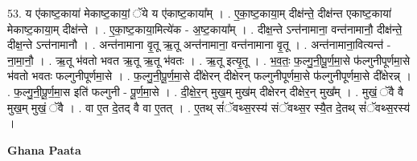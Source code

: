 \documentclass[17pt]{extarticle}
\begin{document}
53. य ए॑काष्ट॒काया॑ मेकाष्ट॒कायां॒ ॅये य ए॑काष्ट॒काया᳚म् । . ए॒का॒ष्ट॒काया॒म् दीक्ष॑न्ते॒ दीक्ष॑न्त एकाष्ट॒काया॑ मेकाष्ट॒काया॒म् दीक्ष॑न्ते । . ए॒का॒ष्ट॒काया॒मित्ये॑क - अ॒ष्ट॒काया᳚म् । . दीक्ष॒न्ते ऽन्त॑नामाना॒ वन्त॑नामानौ॒ दीक्ष॑न्ते॒ दीक्ष॒न्ते ऽन्त॑नामानौ । . अन्त॑नामाना वृ॒तू ऋ॒तू अन्त॑नामाना॒ वन्त॑नामाना वृ॒तू । . अन्त॑नामाना॒वित्यन्त॑ - ना॒मा॒नौ॒ । . ऋ॒तू भ॑वतो भवत ऋ॒तू ऋ॒तू भ॑वतः । . ऋ॒तू इत्यृ॒तू । . भ॒व॒तः॒ फ॒ल्गु॒नी॒पू॒र्ण॒मा॒से फ॑ल्गुनीपूर्णमा॒से भ॑वतो भवतः फल्गुनीपूर्णमा॒से । . फ॒ल्गु॒नी॒पू॒र्ण॒मा॒से दी᳚क्षेरन् दीक्षेरन् फल्गुनीपूर्णमा॒से फ॑ल्गुनीपूर्णमा॒से दी᳚क्षेरन्न् । . फ॒ल्गु॒नी॒पू॒र्ण॒मा॒स इति॑ फल्गुनी - पू॒र्ण॒मा॒से । . दी॒क्षे॒र॒न् मुख॒म् मुख॑म् दीक्षेरन् दीक्षेर॒न् मुख᳚म् । . मुखं॒ ॅवै वै मुख॒म् मुखं॒ ॅवै । . वा ए॒त दे॒तद् वै वा ए॒तत् । . ए॒तथ् सं॑ॅवथ्स॒रस्य॑ संॅवथ्स॒र स्यै॒त दे॒तथ् सं॑ॅवथ्स॒रस्य॑ । \newline

\textbf{Ghana Paata } \newline
\end{document}
